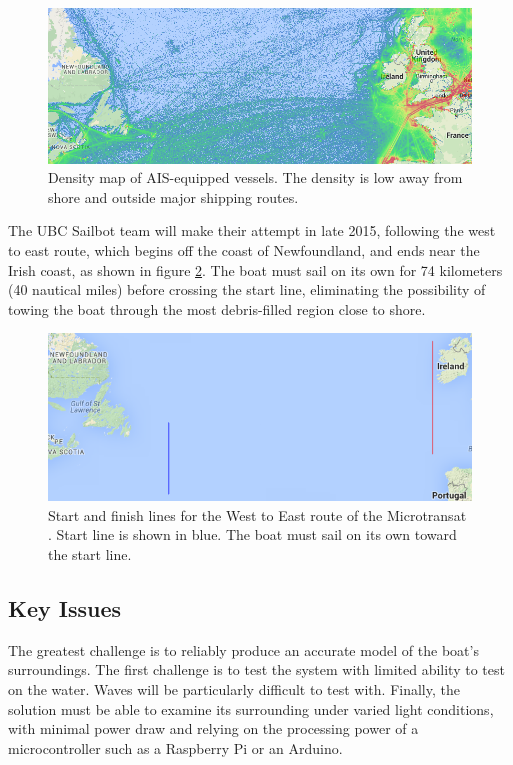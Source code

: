 \begin{figure}[H]
\centering
\includegraphics[width=150mm,natwidth=792,natheight=313]{"./image/AIS_density_north_atlantic_3"}
\caption[Instantaneous position of AIS vessels.]{\label{fig:ais-snapshot}Density map of AIS-equipped vessels.  The density is low away from shore and outside major shipping routes.}
\end{figure}

The UBC Sailbot team will make their attempt in late 2015, following the west to east route, which begins off the coast of Newfoundland, and ends near the Irish coast, as shown in figure \ref{fig:w-e_start-finish}. The boat must sail on its own for 74 kilometers (40 nautical miles) before crossing the start line, eliminating the possibility of towing the boat through the most debris-filled region close to shore.

\begin{figure}[H]
\centering
\includegraphics[width=150mm,natwidth=667,natheight=264]{"./image/start-finish_map"}
\caption[Microtransat keypoints.]{\label{fig:w-e_start-finish}Start and finish lines for the West to East route of the Microtransat \cite{transat__w-e_start-finish}. Start line is shown in blue. The boat must sail on its own toward the start line. }
\end{figure}

\subsection{\label{sec:intro:key-issues}Key Issues}
The greatest challenge is to reliably produce an accurate model of the boat's surroundings. The first challenge is to test the system with limited ability to test on the water.  Waves will be particularly difficult to test with.  Finally, the solution must be able to examine its surrounding under varied light conditions, with minimal power draw and relying on the processing power of a microcontroller such as a Raspberry Pi or an Arduino.

